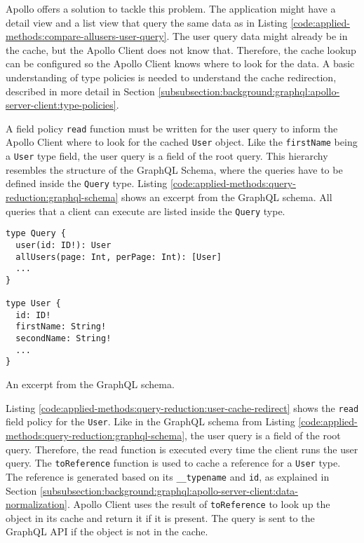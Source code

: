 \noindent Apollo offers a solution to tackle this problem. The application might have a detail view and a list view that query the same data as in Listing \ref{code:applied-methods:compare-allusers-user-query}. The user query data might already be in the cache, but the Apollo Client does not know that. Therefore, the cache lookup can be configured so the Apollo Client knows where to look for the data. A basic understanding of type policies is needed to understand the cache redirection, described in more detail in Section \ref{subsubsection:background:graphql:apollo-server-client:type-policies}.

\bigskip

\noindent A field policy \texttt{read} function must be written for the user query to inform the Apollo Client where to look for the cached \texttt{User} object. Like the \texttt{firstName} being a \texttt{User} type field, the user query is a field of the root query. This hierarchy resembles the structure of the GraphQL Schema, where the queries have to be defined inside the \texttt{Query} type. Listing \ref{code:applied-methods:query-reduction:graphql-schema} shows an excerpt from the GraphQL schema. All queries that a client can execute are listed inside the \texttt{Query} type.

\ifshowListings
\begin{listing}[H]
\begin{verbatim}
type Query {
  user(id: ID!): User
  allUsers(page: Int, perPage: Int): [User]
  ...
}

type User {
  id: ID!
  firstName: String!
  secondName: String!
  ...
}
\end{verbatim}
\caption{An excerpt from the GraphQL schema.}\label{code:applied-methods:query-reduction:graphql-schema}
\end{listing}
\fi


\noindent Listing \ref{code:applied-methods:query-reduction:user-cache-redirect} shows the \texttt{read} field policy for the \texttt{User}. Like in the GraphQL schema from Listing \ref{code:applied-methods:query-reduction:graphql-schema}, the user query is a field of the root query. Therefore, the read function is executed every time the client runs the user query. The \texttt{toReference} function is used to cache a reference for a \texttt{User} type. The reference is generated based on its \texttt{\_\_typename} and \texttt{id}, as explained in Section \ref{subsubsection:background:graphql:apollo-server-client:data-normalization}. Apollo Client uses the result of \texttt{toReference} to look up the object in its cache and return it if it is present. The query is sent to the GraphQL \ac{API} if the object is not in the cache.

